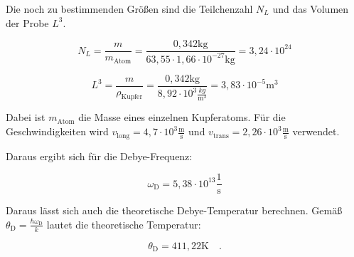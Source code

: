 \noindent Die noch zu bestimmenden Größen sind die Teilchenzahl \(N_L\) und das Volumen der Probe \(L^3\).

\begin{equation*}
N_L=\frac{m}{m_\text{Atom}}=\frac{0,342\text{kg}}{63,55\cdot 1,66\cdot10^{-27}\text{kg}}=3,24\cdot10^{24}
\end{equation*}

\begin{equation*}
L^3=\frac{m}{\rho_\text{Kupfer}}=\frac{0,342\text{kg}}{8,92\cdot10^3\frac{kg}{\text{m}^3}}=3,83\cdot10^{-5}\text{m}^3
\end{equation*}

\noindent Dabei ist \(m_\text{Atom}\) die Masse eines einzelnen Kupferatoms. Für die Geschwindigkeiten wird \(v_\text{long}=4,7\cdot10^3\frac{\text{m}}{\text{s}}\) und \(v_\text{trans}=2,26\cdot10^3\frac{\text{m}}{\text{s}}\) verwendet.

\noindent Daraus ergibt sich für die Debye-Frequenz:

\begin{equation*}
\omega_\text{D}=5,38\cdot10^{13}\frac{1}{\text{s}}
\end{equation*}

\noindent Daraus lässt sich auch die theoretische Debye-Temperatur berechnen. Gemäß $\theta_\text{D}=\frac{\hbar\omega_\text{D}}{k}$ lautet die theoretische Temperatur:

\begin{equation*}
\theta_\text{D}=411,22\text{K}\quad.
\end{equation*}